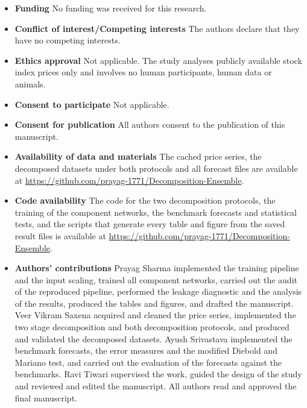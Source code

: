 \documentclass[pdflatex,sn-mathphys-num]{sn-jnl}%
\theoremstyle{thmstyleone}%
\theoremstyle{thmstyletwo}%
\theoremstyle{thmstylethree}%
\begin{document}
\begin{itemize}
\item \textbf{Funding} \; No funding was received for this research.
\item \textbf{Conflict of interest/Competing interests} \; The authors declare that
they have no competing interests.
\item \textbf{Ethics approval} \; Not applicable. The study analyses publicly available
stock index prices only and involves no human participants, human data or animals.
\item \textbf{Consent to participate} \; Not applicable.
\item \textbf{Consent for publication} \; All authors consent to the publication of this
manuscript.
\item \textbf{Availability of data and materials} \; The cached price series, the
decomposed datasets under both protocols and all forecast files are available at
\url{https://github.com/prayag-1771/Decomposition-Ensemble}.
\item \textbf{Code availability} \; The code for the two decomposition protocols, the
training of the component networks, the benchmark forecasts and statistical tests, and
the scripts that generate every table and figure from the saved result files is
available at \url{https://github.com/prayag-1771/Decomposition-Ensemble}.
\item \textbf{Authors' contributions} \; Prayag Sharma implemented the training
pipeline and the input scaling, trained all component networks, carried out the audit
of the reproduced pipeline, performed the leakage diagnostic and the analysis of the
results, produced the tables and figures, and drafted the manuscript. Veer Vikram
Saxena acquired and cleaned the price series, implemented the two stage decomposition
and both decomposition protocols, and produced and validated the decomposed datasets.
Ayush Srivastava implemented the benchmark forecasts, the error measures and the
modified Diebold and Mariano test, and carried out the evaluation of the forecasts
against the benchmarks. Ravi Tiwari supervised the work, guided the design of the study
and reviewed and edited the manuscript. All authors read and approved the final
manuscript.
\end{itemize}
\end{document}
